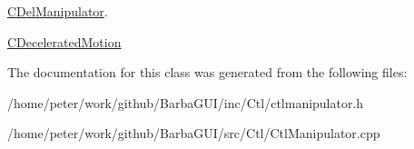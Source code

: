 \hyperlink{classCDelManipulator}{C\+Del\+Manipulator}. 

\hyperlink{classCDeceleratedMotion}{C\+Decelerated\+Motion} 

The documentation for this class was generated from the following files\+:\begin{DoxyCompactItemize}
\item 
/home/peter/work/github/\+Barba\+G\+U\+I/inc/\+Ctl/ctlmanipulator.\+h\item 
/home/peter/work/github/\+Barba\+G\+U\+I/src/\+Ctl/Ctl\+Manipulator.\+cpp\end{DoxyCompactItemize}
